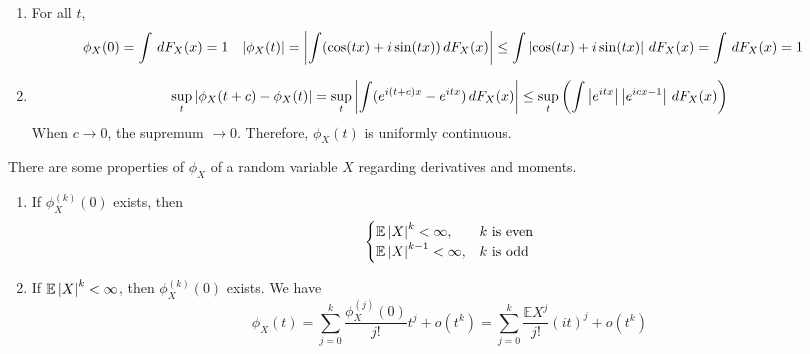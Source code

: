 \documentclass{huhtakm-template-book}
\newcommand{\expect}{\mathbb{E}}
\begin{document}
\begin{proofing}
	\begin{enumerate}
		\item For all $t$,
		\begin{align*}
			\phi_{X}(0)&=\int\,dF_{X}(x)=1 & \left|{\phi_{X}(t)}\right|&=\left|{\int(\cos(tx)+i\sin(tx))\,dF_{X}(x)}\right|\leq\int\left|{\cos(tx)+i\sin(tx)}\right|\,dF_{X}(x)=\int\,dF_{X}(x)=1
		\end{align*}
		\item
		\begin{equation*}
			\sup_{t}\left|{\phi_{X}(t+c)-\phi_{X}(t)}\right|=\sup_{t}\left|{\int(e^{i(t+c)x}-e^{itx})\,dF_{X}(x)}\right|\leq\sup_{t}\left(\int\left|{e^{itx}}\right|\left|{e^{icx-1}}\right|\,dF_{X}(x)\right)
		\end{equation*}
		When $c\to 0$, the supremum $\to 0$. Therefore, $\phi_{X}(t)$ is uniformly continuous.
	\end{enumerate}
\end{proofing}
\begin{thm}
	There are some properties of $\phi_{X}$ of a random variable $X$ regarding derivatives and moments.
	\begin{enumerate}
		\item If $\phi_{X}^{(k)}(0)$ exists, then
		\begin{equation*}
			\begin{cases}
				\expect\abs{X}^{k}<\infty, &k\text{ is even}\\
				\expect\abs{X}^{k-1}<\infty, &k\text{ is odd}
			\end{cases}
		\end{equation*}
		\item If $\expect\abs{X}^{k}<\infty$, then $\phi_{X}^{(k)}(0)$ exists. We have
		\begin{equation*}
			\phi_{X}(t)=\sum_{j=0}^{k}\frac{\phi_{X}^{(j)}(0)}{j!}t^{j}+o(t^{k})=\sum_{j=0}^{k}\frac{\expect X^{j}}{j!}(it)^{j}+o(t^{k})
		\end{equation*}
	\end{enumerate}
\end{thm}
\end{document}
